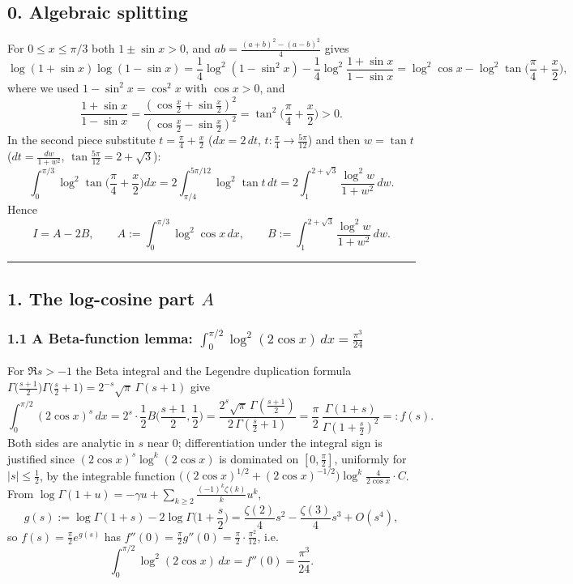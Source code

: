 \documentclass[11pt]{article}
\theoremstyle{remark}
\begin{document}
\subsection*{0. Algebraic splitting}

For $0\le x\le\pi/3$ both $1\pm\sin x>0$, and $ab=\frac{(a+b)^2-(a-b)^2}{4}$ gives
\[
\log(1+\sin x)\log(1-\sin x)=\frac14\log^2(1-\sin^2x)-\frac14\log^2\frac{1+\sin x}{1-\sin x}
=\log^2\cos x-\log^2\tan\Big(\frac\pi4+\frac x2\Big),
\]
where we used $1-\sin^2x=\cos^2x$ with $\cos x>0$, and
\[
\frac{1+\sin x}{1-\sin x}=\frac{(\cos\frac x2+\sin\frac x2)^2}{(\cos\frac x2-\sin\frac x2)^2}
=\tan^2\Big(\frac\pi4+\frac x2\Big)>0 .
\]
In the second piece substitute $t=\frac\pi4+\frac x2$ ($dx=2\,dt$, $t:\frac\pi4\to\frac{5\pi}{12}$) and then $w=\tan t$ ($dt=\frac{dw}{1+w^2}$, $\tan\frac{5\pi}{12}=2+\sqrt3$):
\[
\int_0^{\pi/3}\log^2\tan\Big(\frac\pi4+\frac x2\Big)dx=2\int_{\pi/4}^{5\pi/12}\log^2\tan t\,dt
=2\int_1^{2+\sqrt3}\frac{\log^2w}{1+w^2}\,dw .
\]
Hence
\begin{equation*}
I=A-2B,\qquad
A:=\int_0^{\pi/3}\log^2\cos x\,dx,\qquad
B:=\int_1^{2+\sqrt3}\frac{\log^2w}{1+w^2}\,dw. \tag{0.1}
\end{equation*}

\begin{center}\rule{0.6\textwidth}{0.4pt}\end{center}

\subsection*{1. The log-cosine part $A$}

\subsubsection*{1.1 A Beta-function lemma: $\displaystyle\int_0^{\pi/2}\log^2(2\cos x)\,dx=\frac{\pi^3}{24}$}

For $\Re s>-1$ the Beta integral and the Legendre duplication formula $\Gamma\!\big(\frac{s+1}{2}\big)\Gamma\!\big(\frac s2+1\big)=2^{-s}\sqrt\pi\,\Gamma(s+1)$ give
\[
\int_0^{\pi/2}(2\cos x)^s\,dx=2^s\cdot\frac12 B\Big(\frac{s+1}2,\frac12\Big)
=\frac{2^s\sqrt{\pi}\,\Gamma(\frac{s+1}2)}{2\,\Gamma(\frac s2+1)}
=\frac{\pi}{2}\,\frac{\Gamma(1+s)}{\Gamma(1+\frac s2)^2}=:f(s).
\]
Both sides are analytic in $s$ near $0$; differentiation under the integral sign is justified since $(2\cos x)^s\log^k(2\cos x)$ is dominated on $[0,\frac\pi2]$, uniformly for $|s|\le\frac12$, by the integrable function $\big((2\cos x)^{1/2}+(2\cos x)^{-1/2}\big)\log^k\!\frac{4}{2\cos x}\cdot C$. From $\log\Gamma(1+u)=-\gamma u+\sum_{k\ge2}\frac{(-1)^k\zeta(k)}{k}u^k$,
\[
g(s):=\log\Gamma(1+s)-2\log\Gamma\Big(1+\frac s2\Big)=\frac{\zeta(2)}{4}s^2-\frac{\zeta(3)}{4}s^3+O(s^4),
\]
so $f(s)=\frac\pi2 e^{g(s)}$ has $f''(0)=\frac\pi2 g''(0)=\frac{\pi}{2}\cdot\frac{\pi^2}{12}$, i.e.
\begin{equation*}
\int_0^{\pi/2}\log^2(2\cos x)\,dx=f''(0)=\frac{\pi^3}{24}. \tag{1.1}
\end{equation*}
\end{document}
